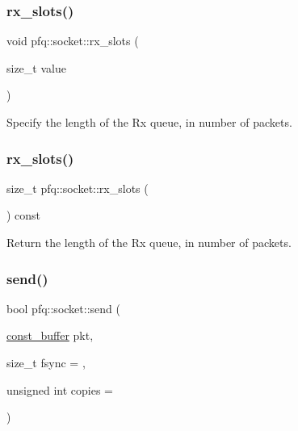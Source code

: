 \subsubsection{\texorpdfstring{rx\+\_\+slots()}{rx\_slots()}\hspace{0.1cm}{\footnotesize\ttfamily [1/2]}}
{\footnotesize\ttfamily void pfq\+::socket\+::rx\+\_\+slots (\begin{DoxyParamCaption}\item[{size\+\_\+t}]{value }\end{DoxyParamCaption})\hspace{0.3cm}{\ttfamily [inline]}}



Specify the length of the Rx queue, in number of packets. 

\mbox{\label{classpfq_1_1socket_a34d80296c96c3e727f437d0be1b81dd8}} 
\subsubsection{\texorpdfstring{rx\+\_\+slots()}{rx\_slots()}\hspace{0.1cm}{\footnotesize\ttfamily [2/2]}}
{\footnotesize\ttfamily size\+\_\+t pfq\+::socket\+::rx\+\_\+slots (\begin{DoxyParamCaption}{ }\end{DoxyParamCaption}) const\hspace{0.3cm}{\ttfamily [inline]}}



Return the length of the Rx queue, in number of packets. 

\mbox{\label{classpfq_1_1socket_a6571d1041154d567abe1304e9decf656}} 
\subsubsection{\texorpdfstring{send()}{send()}}
{\footnotesize\ttfamily bool pfq\+::socket\+::send (\begin{DoxyParamCaption}\item[{\hyperlink{namespacepfq_ac835a1bd09b4cbaba61c100b50d0a99f}{const\+\_\+buffer}}]{pkt,  }\item[{size\+\_\+t}]{fsync = {},  }\item[{unsigned int}]{copies = {} }\end{DoxyParamCaption})\hspace{0.3cm}{\ttfamily [inline]}}



